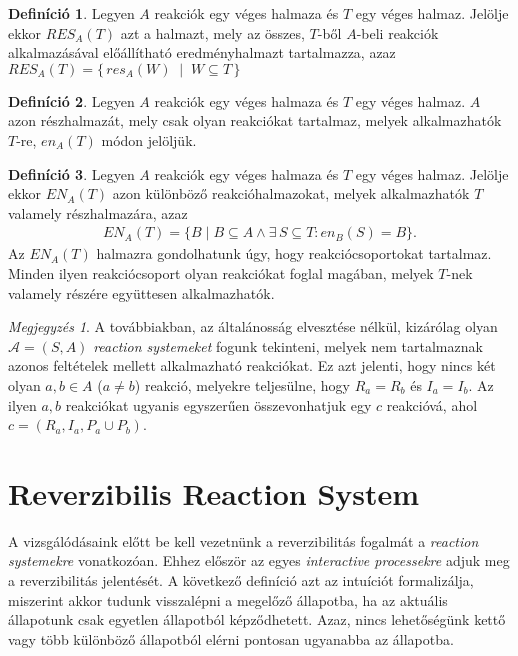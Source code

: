 \documentclass[12pt]{article}
\theoremstyle{definition}
\newtheorem{definition}{Definíció}
\theoremstyle{remark}
\newtheorem*{remark*}{Megjegyzés}
\theoremstyle{plain}
\theoremstyle{remark}
\theoremstyle{plain}
\newcommand{\en}{\textit{en}}
\newcommand{\res}{\textit{res}}
\begin{document}
    \begin{definition}
        Legyen $A$ reakciók egy véges halmaza és $T$ egy véges halmaz. Jelölje ekkor $\textit{RES}_{A}(T)$ azt a halmazt, mely az összes, $T$-ből $A$-beli reakciók alkalmazásával előállítható eredményhalmazt tartalmazza, azaz $\textit{RES}_{A}(T) = \{ \, \res_{A}(W) \; \mid \; W \subseteq T\, \}$
    \end{definition}

    \begin{definition}
        Legyen $A$ reakciók egy véges halmaza és $T$ egy véges halmaz. $A$ azon részhalmazát, mely csak olyan reakciókat tartalmaz, melyek alkalmazhatók $T$-re, $\en_{A}(T)$ módon jelöljük.
    \end{definition}

    \begin{definition}
        Legyen $A$ reakciók egy véges halmaza és $T$ egy véges halmaz. Jelölje ekkor $\textit{EN}_{A}(T)$ azon különböző reakcióhalmazokat, melyek alkalmazhatók $T$ valamely részhalmazára, azaz
        \begin{align*}
            \textit{EN}_{A}(T) = \{ B \;|\; B \subseteq A \wedge \exists\,S \subseteq T : \en_{B}(S) = B \}.
        \end{align*}
        Az $\textit{EN}_{A}(T)$ halmazra gondolhatunk úgy, hogy reakciócsoportokat tartalmaz. Minden ilyen reakciócsoport olyan reakciókat foglal magában, melyek $T$-nek valamely részére együttesen alkalmazhatók.
    \end{definition}

    \begin{remark*}
        A továbbiakban, az általánosság elvesztése nélkül, kizárólag olyan $\mathscr{A} = (S, A)$ \textit{reaction systemeket} fogunk tekinteni, melyek nem tartalmaznak azonos feltételek mellett alkalmazható reakciókat. Ez azt jelenti, hogy nincs két olyan $a, b\in A$ ($a \neq b$) reakció, melyekre teljesülne, hogy $R_{a} = R_{b}$ és $I_{a} = I_{b}$. Az ilyen $a, b$ reakciókat ugyanis egyszerűen összevonhatjuk egy $c$ reakcióvá, ahol $c = (R_{a}, I_{a}, P_{a} \cup P_{b})$.
    \end{remark*}    

    \section*{Reverzibilis Reaction System}

    A vizsgálódásaink előtt be kell vezetnünk a reverzibilitás fogalmát a \textit{reaction systemekre} vonatkozóan. Ehhez  először az egyes \textit{interactive processekre} adjuk meg a reverzibilitás jelentését. A következő definíció azt az intuíciót formalizálja, miszerint akkor tudunk visszalépni a megelőző állapotba, ha az aktuális állapotunk csak egyetlen állapotból képződhetett. Azaz, nincs lehetőségünk kettő vagy több különböző állapotból elérni pontosan ugyanabba az állapotba.
\end{document}
